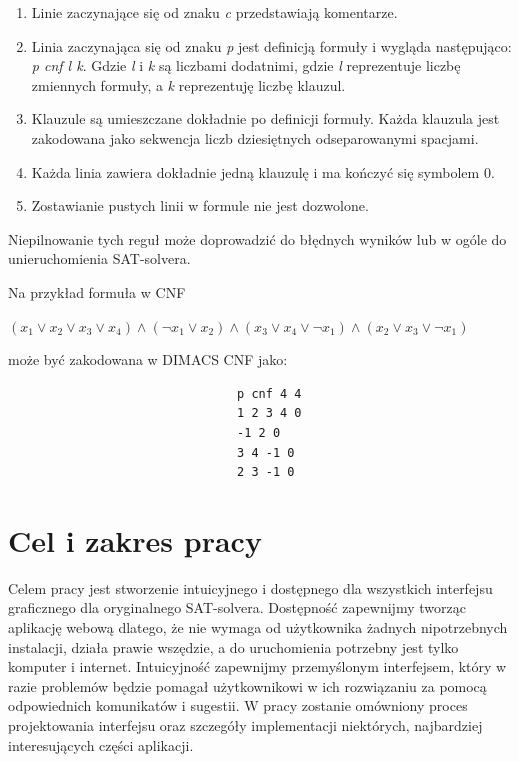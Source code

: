 \documentclass[a4paper,12pt,oneside]{book}
\theoremstyle{definition}
\begin{document}
\begin{enumerate}
    \item Linie zaczynające się od znaku \textit{c} przedstawiają komentarze.
    \item Linia zaczynająca się od znaku \textit{p} jest definicją formuły i wygląda następująco: \textit{p cnf l k}. Gdzie \textit{l} i \textit{k} są liczbami dodatnimi, gdzie \textit{l} reprezentuje liczbę zmiennych formuły, a \textit{k} reprezentuję liczbę klauzul.
    \item Klauzule są umieszczane dokładnie po definicji formuły. Każda klauzula jest zakodowana jako sekwencja liczb dziesiętnych odseparowanymi spacjami.
    \item Każda linia zawiera dokładnie jedną klauzulę i ma kończyć się symbolem 0.
    \item Zostawianie pustych linii w formule nie jest dozwolone.
\end{enumerate}
Niepilnowanie tych reguł może doprowadzić do błędnych wyników lub w ogóle do unieruchomienia SAT-solvera.

Na przykład formuła w CNF

\begin{center}
    $(x_1 \lor x_2 \lor x_3 \lor x_4) \land (\neg x_1 \lor x_2) \land (x_3 \lor x_4 \lor \neg x_1) \land (x_2 \lor x_3 \lor \neg x_1)$ 
\end{center}

może być zakodowana w DIMACS CNF jako:

\begin{verbatim}
                                p cnf 4 4
                                1 2 3 4 0
                                -1 2 0
                                3 4 -1 0
                                2 3 -1 0
\end{verbatim}

\section{Cel i zakres pracy}

Celem pracy jest stworzenie intuicyjnego i dostępnego dla wszystkich interfejsu graficznego dla oryginalnego SAT-solvera. Dostępność zapewnijmy tworząc aplikację webową dlatego, że nie wymaga od użytkownika żadnych nipotrzebnych instalacji, działa prawie wszędzie, a do uruchomienia potrzebny jest tylko komputer i internet. Intuicyjność zapewnijmy przemyślonym interfejsem, który w razie problemów będzie pomagał użytkownikowi w ich rozwiązaniu za pomocą odpowiednich komunikatów i sugestii. W pracy zostanie omówniony proces projektowania interfejsu oraz szczegóły implementacji niektórych, najbardziej interesujących części aplikacji. 
\end{document}
